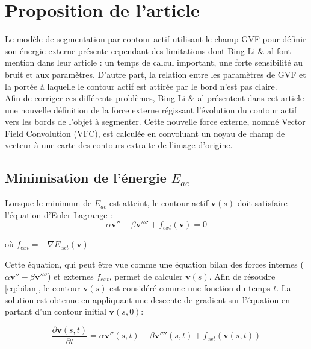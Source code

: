\section{Proposition de l'article}

Le modèle de segmentation par contour actif utilisant le champ GVF pour définir son énergie externe présente cependant des limitations dont Bing Li \& al font mention dans leur article : un temps de calcul important, une forte sensibilité au bruit et aux paramètres. D'autre part, la relation entre les paramètres de GVF et la portée à laquelle le contour actif est attirée par le bord n'est pas claire.\\

Afin de corriger ces différents problèmes, Bing Li \& al présentent dans cet article une nouvelle définition de la force externe régissant l'évolution du contour actif vers les bords  de l'objet à segmenter. Cette nouvelle force externe, nommé Vector Field Convolution (VFC), est calculée en convoluant un noyau de champ de vecteur à une carte des contours extraite de l'image d'origine.   

\subsection{Minimisation de l'énergie $E_{ac}$}

Lorsque le minimum de $E_{ac}$ est atteint, le contour actif $\mathbf{v}(s)$ doit satisfaire l'équation d'Euler-Lagrange :
\begin{equation}
	\alpha \mathbf{v}'' - \beta \mathbf{v}'''' + f_{ext}(\mathbf{v}) = 0
	\label{eq:bilan}
\end{equation}

où $f_{ext}= - \nabla E_{ext}(\mathbf{v})$

Cette équation, qui peut être vue comme une équation bilan des forces internes ($\alpha \mathbf{v}'' - \beta \mathbf{v}''''$) et externes $f_{ext}$, permet de calculer $\mathbf{v}(s)$. Afin de résoudre \ref{eq:bilan}, le contour $\mathbf{v}(s)$ est considéré comme une fonction du temps $t$. La solution est obtenue en appliquant une descente de gradient sur l'équation en partant d'un contour initial $\mathbf{v}(s,0)$:

\begin{equation}
	\frac{\partial \mathbf{v}(s,t)}{\partial t} = \alpha \mathbf{v}''(s,t) - \beta \mathbf{v}''''(s,t)+f_{ext}(\mathbf{v}(s,t))
	\label{eq:graddesc}
\end{equation}

